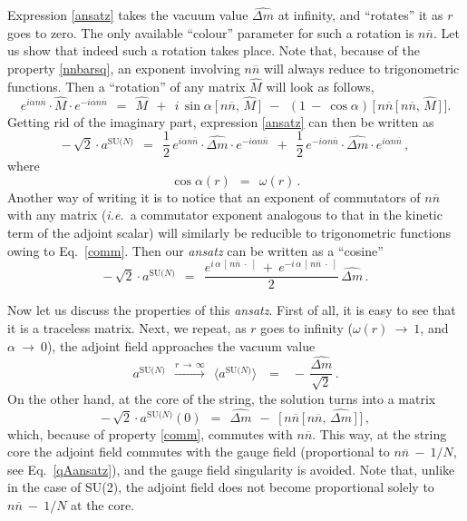 \documentclass[12pt]{article}
\def\beq{\begin{equation}}
\def\eeq{\end{equation}}
\newcommand{\ov}{\overline}
\newcommand{\aN}{a^\text{SU($N$)}}
\newcommand{\nnbar}{n\ov{n}}
\newcommand{\dm}{\hat{{\scriptstyle \Delta} m}}
\newcommand{\ie}{{\it i.e.}~}
\newcommand{\ansatz}{{\it ansatz} }
\begin{document}
	Expression \eqref{ansatz} takes the vacuum value $ \dm $ at infinity, and 
	``rotates'' it as $ r $ goes to zero.
	The only available ``colour'' parameter for such a rotation is $ \nnbar $.
	Let us show that indeed such a rotation takes place.
	Note that, because of the property \eqref{nnbarsq}, an exponent involving $ \nnbar $
	will always reduce to trigonometric functions.
	Then a ``rotation'' of any matrix $ \hat{M} $ will look as follows,
\beq
	e^{i \alpha \nnbar} \cdot \hat{M} \cdot e^{- i \alpha \nnbar}    ~~=~~
	\hat{M}  ~~+~~  i\, \sin \alpha \: \big[\, \nnbar,\, \hat{M} \,\big]
	~~-~~  ( 1 ~-~ \cos \alpha )\, \Big[\, \nnbar\, \big[\, \nnbar,\, \hat{M} \,\big] \,\Big].
\eeq
	Getting rid of the imaginary part, expression \eqref{ansatz} can then be written as
\beq
\label{rotation}
	-\, \sqrt{2} \cdot \aN    ~~=~~    
	\frac{1}{2}\, e^{i \alpha \nnbar} \cdot \dm \cdot e^{- i \alpha \nnbar}  ~~+~~
	\frac{1}{2}\, e^{- i \alpha \nnbar} \cdot \dm \cdot e^{i \alpha \nnbar}\,,
\eeq
	where 
\beq
	\cos\alpha(r)    ~~=~~    \omega(r)\,.
\eeq
	Another way of writing it is to notice that an exponent of commutators of $ \nnbar $
	with any matrix (\ie a commutator exponent analogous to that in the kinetic term
	of the adjoint scalar) will similarly be reducible to trigonometric functions owing
	to Eq.~\eqref{comm}. 
	Then our \ansatz can be written as a ``cosine''
\beq
	-\, \sqrt{2} \cdot \aN    ~~=~~
	\frac{ e^{ i\, \alpha\, [\, \nnbar \; \cdot \;] } 
	   ~+~ e^{ - i\, \alpha\, [\, \nnbar \; \cdot \;] } } { 2 }\, \dm\,.
\eeq

	Now let us discuss the properties of this {\it ansatz}. 
	First of all, it is easy to see that it is a traceless matrix.
	Next, we repeat, as $ r $ goes to infinity ($ \omega(r) ~\to~ 1$, and $ \alpha ~\to~ 0 $),
	the adjoint field approaches the vacuum value
\beq
	\aN    ~~\overset{r\,\to\,\infty}{\longrightarrow}~~    
	\langle \aN \rangle    \;~~=~~\;    -\, \frac{\dm}{\sqrt{2}}\,.
\eeq
	On the other hand, at the core of the string, the solution turns into a matrix
\beq
	-\, \sqrt{2} \cdot \aN(0)    ~~=~~    \dm  ~~-~~  \Big[\, \nnbar\, \big[\, \nnbar,\, \dm \,\big] \,\Big]\,,
\eeq
	which, because of property \eqref{comm}, commutes with $ \nnbar $.
	This way,  at the string core the adjoint field commutes with the gauge field 
	(proportional to $ \nnbar ~-~ 1/N $, see Eq.~\eqref{qAansatz}), 
	and the gauge field singularity is avoided.
	Note that, unlike in the case of SU(2), the adjoint field does not become proportional solely to $ \nnbar ~-~ 1/N $
	at the core.
\end{document}
